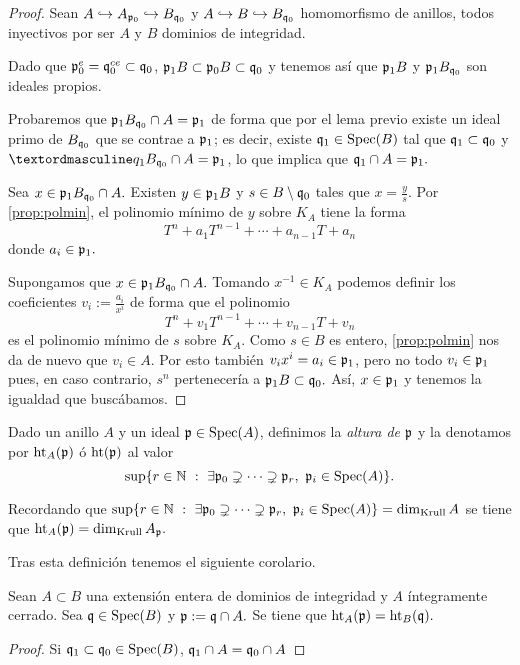 \documentclass[../main.tex]{subfiles}
\begin{document}
\begin{proof}
Sean $A\hookrightarrow A_{\mathfrak{p}_0}\hookrightarrow B_{\mathfrak{q}_0}$ y $A\hookrightarrow B\hookrightarrow B_{\mathfrak{q}_0}$ homomorfismo de anillos, todos inyectivos por ser $A$ y $B$ dominios de integridad.

Dado que $\mathfrak{p}_0^e=\mathfrak{q}_0^{ce}\subset\mathfrak{q}_0$, $\mathfrak{p}_1B\subset\mathfrak{p}_0B\subset\mathfrak{q}_0$ y tenemos así que $\mathfrak{p}_1B$ y $\mathfrak{p}_1B_{\mathfrak{q}_0}$ son ideales propios.

Probaremos que $\mathfrak{p}_1 B_{\mathfrak{q}_0}\cap A=\mathfrak{p}_1$ de forma que por el lema previo existe un ideal primo de $B_{\mathfrak{q}_0}$ que se contrae a $\mathfrak{p}_1$; es decir, existe $\mathfrak{q}_1\in\text{Spec}(B)$ tal que $\mathfrak{q}_1\subset\mathfrak{q}_0$ y $ºq_1B_{\q_0}\cap A=\p_1$, lo que implica que $\mathfrak{q}_1\cap A=\mathfrak{p}_1.$

Sea $x\in \mathfrak{p}_1 B_{\mathfrak{q}_0}\cap A.$ Existen $y\in\mathfrak{p}_1 B$ y $s\in B\setminus\mathfrak{q}_0$ tales que $x=\frac{y}{s}.$ Por \ref{prop:polmin}, el polinomio mínimo de $y$ sobre $K_A$ tiene la forma
$$T^n+a_1T^{n-1}+\cdots+a_{n-1}T+a_n$$
donde $a_i\in\mathfrak{p}_1.$

Supongamos que $x\in\mathfrak{p}_1 B_{\mathfrak{q}_0}\cap A.$ Tomando $x^{-1}\in K_A$ podemos definir los coeficientes $v_i:=\frac{a_i}{x^i}$ de forma que el polinomio
$$T^n+v_1T^{n-1}+\cdots+v_{n-1}T+v_n$$
es el polinomio mínimo de $s$ sobre $K_A.$ Como $s\in B$ es entero, \ref{prop:polmin} nos da de nuevo que $v_i\in A.$ Por esto también $v_i x^i=a_i\in\mathfrak{p}_1$, pero no todo $v_i\in\mathfrak{p}_1$ pues, en caso contrario, $s^n$ pertenecería a $\mathfrak{p}_1B\subset \mathfrak{q}_0.$ Así, $x\in\mathfrak{p}_1$ y tenemos la igualdad que buscábamos.
\end{proof}

\begin{definition}
Dado un anillo $A$ y un ideal $\mathfrak{p}\in\text{Spec}(A)$, definimos la \textit{altura de $\mathfrak{p}$} y la denotamos por $\operatorname{ht}_A(\mathfrak{p})$ ó $\operatorname{ht}(\mathfrak{p})$ al valor
$$\sup\{r\in\mathbb{N}\ :\ \exists\mathfrak{p}_0\supsetneq \cdots \supsetneq \mathfrak{p}_r,\ \mathfrak{p}_i\in\text{Spec}(A)\}.$$
\end{definition}

\begin{remark}
Recordando que $\sup\{r\in\N\ :\ \exists\p_0\supsetneq \cdots \supsetneq \p_r,\ \p_i\in\Spec A\}=\dimk A$ se tiene que $\operatorname{ht}_A(\mathfrak{p})=\dim_{\text{Krull}} A_{\mathfrak{p}}.$
\end{remark}

Tras esta definición tenemos el siguiente corolario.

\begin{corollary}
Sean $A\subset B$ una extensión entera de dominios de integridad y $A$ íntegramente cerrado. Sea $\mathfrak{q}\in\text{Spec}(B)$ y $\mathfrak{p}:=\mathfrak{q}\cap A.$ Se tiene que $\operatorname{ht}_A(\mathfrak{p})=\operatorname{ht}_B(\mathfrak{q}).$
\end{corollary}

\begin{proof}
Si $\mathfrak{q}_1\subset\mathfrak{q}_0\in\text{Spec}(B)$, $\mathfrak{q}_1\cap A=\mathfrak{q}_0\cap A$
\end{proof}
\end{document}
